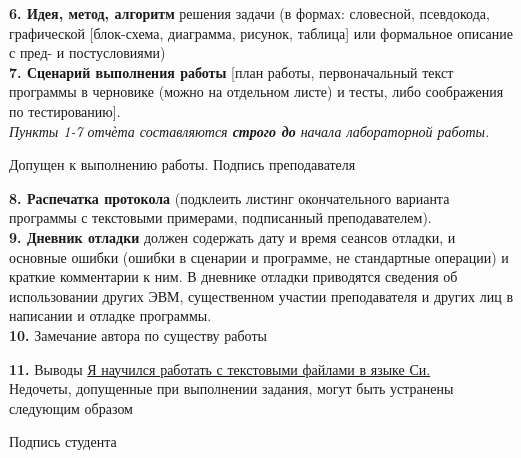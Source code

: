 \documentclass[10pt]{report}
\begin{document}
    \begin{spacing}{1}
        \indent \textbf{6. Идея, метод, алгоритм} решения задачи (в формах: словесной, псевдокода, графической [блок-схема, диаграмма, рисунок, таблица] или формальное описание с пред- и постусловиями)\\
        
    
        \indent \textbf{7. Сценарий выполнения работы} [план работы, первоначальный текст программы в черновике (можно на отдельном листе) и тесты, либо соображения по тестированию].\\
        
        \textit{Пункты 1-7 отчѐта составляются \textbf{строго до} начала лабораторной работы.}\\
        \begin{flushright}
            Допущен к выполнению работы. Подпись преподавателя \underline{\hspace{1.5in}}\\
        \end{flushright}
    
        \indent \textbf{8. Распечатка протокола} (подклеить листинг окончательного варианта программы с текстовыми
        примерами, подписанный преподавателем).\\
        
    
        \indent \textbf{9. Дневник отладки} должен содержать дату и время сеансов отладки, и основные ошибки (ошибки в
        сценарии и программе, не стандартные операции) и краткие комментарии к ним. В дневнике отладки
        приводятся сведения об использовании других ЭВМ, существенном участии преподавателя и других
        лиц в написании и отладке программы.\\
        
        
        \indent \textbf{10.} Замечание автора по существу работы \underline{\hspace{3.5in}}\\
        \underline{\hspace{5.5in}}
        
        \indent \textbf{11.} Выводы \underline{\hspace{0.5in}Я научился работать с текстовыми файлами в языке Си.\hspace{0.5in}}\\


        Недочеты, допущенные при выполнении задания, могут быть устранены следующим образом \underline{\hspace{0.5in}}\\
        \underline{\hspace{5.5in}}

        \begin{flushright}
            Подпись студента \underline{\hspace{1.5in}}\\
        \end{flushright}

    \end{spacing}
    
   
    
    
\end{document}
